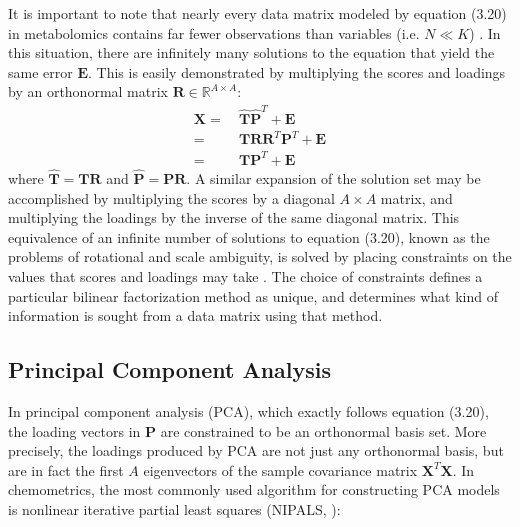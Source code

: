 \begin{doublespace}
It is important to note that nearly every data matrix modeled by equation
(3.20) in metabolomics contains far fewer observations than variables
(i.e. $N \ll K$) \cite{worley:cmb2013}. In this situation, there are infinitely
many solutions to the equation that yield the same error $\mathbf{E}$. This is
easily demonstrated by multiplying the scores and loadings by an orthonormal
matrix $\mathbf{R} \in \mathbb{R}^{A \times A}$:
\begin{align}
\mathbf{X}
 =& \: \hat{\mathbf{T}} \hat{\mathbf{P}}^T + \mathbf{E}
\nonumber \\
 =& \: \mathbf{T} \mathbf{R} \mathbf{R}^T \mathbf{P}^T + \mathbf{E}
\nonumber \\
 =& \: \mathbf{T} \mathbf{P}^T + \mathbf{E}
\end{align}
where $\hat{\mathbf{T}} = \mathbf{T} \mathbf{R}$ and
$\hat{\mathbf{P}} = \mathbf{P} \mathbf{R}$. A similar expansion of the solution
set may be accomplished by multiplying the scores by a diagonal $A \times A$
matrix, and multiplying the loadings by the inverse of the same diagonal
matrix. This equivalence of an infinite number of solutions to equation
(3.20), known as the problems of rotational and scale ambiguity, is solved by
placing constraints on the values that scores and loadings may take
\cite{dejuan:aca1997,jolliffe2002}. The choice of constraints defines a
particular bilinear factorization method as unique, and determines what
kind of information is sought from a data matrix using that method.
\end{doublespace}

\subsection{Principal Component Analysis}

\begin{doublespace}
In principal component analysis (PCA), which exactly follows equation (3.20),
the loading vectors in $\mathbf{P}$ are constrained to be an orthonormal basis
set. More precisely, the loadings produced by PCA are not just any orthonormal
basis, but are in fact the first $A$ eigenvectors of the sample covariance
matrix $\mathbf{X}^T \mathbf{X}$. In chemometrics, the most commonly used
algorithm for constructing PCA models is nonlinear iterative partial least
squares (NIPALS, \cite{geladi:aca1986}):
\end{doublespace}

